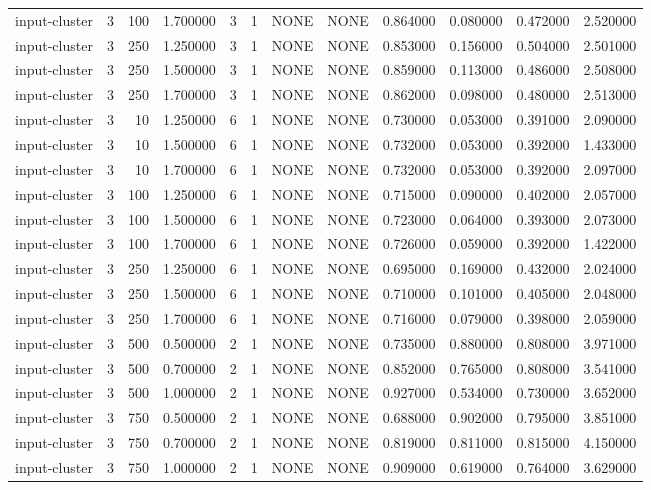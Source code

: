 \begin{tabular}{lrrrllllrrrr}
input-cluster & 3 & 100 & 1.700000 & 3 & 1 & NONE & NONE & 0.864000 & 0.080000 & 0.472000 & 2.520000 \\
input-cluster & 3 & 250 & 1.250000 & 3 & 1 & NONE & NONE & 0.853000 & 0.156000 & 0.504000 & 2.501000 \\
input-cluster & 3 & 250 & 1.500000 & 3 & 1 & NONE & NONE & 0.859000 & 0.113000 & 0.486000 & 2.508000 \\
input-cluster & 3 & 250 & 1.700000 & 3 & 1 & NONE & NONE & 0.862000 & 0.098000 & 0.480000 & 2.513000 \\
input-cluster & 3 & 10 & 1.250000 & 6 & 1 & NONE & NONE & 0.730000 & 0.053000 & 0.391000 & 2.090000 \\
input-cluster & 3 & 10 & 1.500000 & 6 & 1 & NONE & NONE & 0.732000 & 0.053000 & 0.392000 & 1.433000 \\
input-cluster & 3 & 10 & 1.700000 & 6 & 1 & NONE & NONE & 0.732000 & 0.053000 & 0.392000 & 2.097000 \\
input-cluster & 3 & 100 & 1.250000 & 6 & 1 & NONE & NONE & 0.715000 & 0.090000 & 0.402000 & 2.057000 \\
input-cluster & 3 & 100 & 1.500000 & 6 & 1 & NONE & NONE & 0.723000 & 0.064000 & 0.393000 & 2.073000 \\
input-cluster & 3 & 100 & 1.700000 & 6 & 1 & NONE & NONE & 0.726000 & 0.059000 & 0.392000 & 1.422000 \\
input-cluster & 3 & 250 & 1.250000 & 6 & 1 & NONE & NONE & 0.695000 & 0.169000 & 0.432000 & 2.024000 \\
input-cluster & 3 & 250 & 1.500000 & 6 & 1 & NONE & NONE & 0.710000 & 0.101000 & 0.405000 & 2.048000 \\
input-cluster & 3 & 250 & 1.700000 & 6 & 1 & NONE & NONE & 0.716000 & 0.079000 & 0.398000 & 2.059000 \\
input-cluster & 3 & 500 & 0.500000 & 2 & 1 & NONE & NONE & 0.735000 & 0.880000 & 0.808000 & 3.971000 \\
input-cluster & 3 & 500 & 0.700000 & 2 & 1 & NONE & NONE & 0.852000 & 0.765000 & 0.808000 & 3.541000 \\
input-cluster & 3 & 500 & 1.000000 & 2 & 1 & NONE & NONE & 0.927000 & 0.534000 & 0.730000 & 3.652000 \\
input-cluster & 3 & 750 & 0.500000 & 2 & 1 & NONE & NONE & 0.688000 & 0.902000 & 0.795000 & 3.851000 \\
input-cluster & 3 & 750 & 0.700000 & 2 & 1 & NONE & NONE & 0.819000 & 0.811000 & 0.815000 & 4.150000 \\
input-cluster & 3 & 750 & 1.000000 & 2 & 1 & NONE & NONE & 0.909000 & 0.619000 & 0.764000 & 3.629000 \\

\end{tabular}
